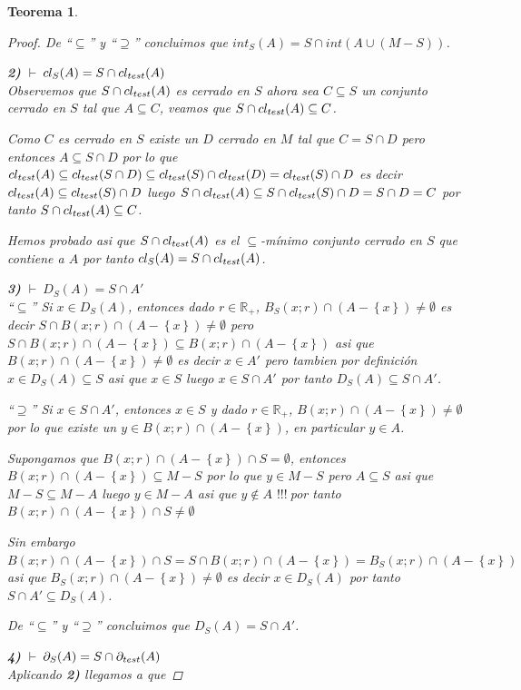\documentclass[oneside]{book} %
\theoremstyle{Teorema}
\newtheorem{Teorema}[Definicion]{Teorema}
\theoremstyle{Ejemplos}
\theoremstyle{[Obs]}
\def \test {test}
\newcommand{\cerradura}[2][\test]{\ifx \test #1 {\overline{#2}} \else {cl_{#1}(#2)} \fi} %
\newcommand{\frontera}[2][\test]{\ifx \test #1 {\partial(#2)} \else {\partial_{#1}(#2)} \fi} %
\renewcommand{\{}{\left\lbrace} %
\renewcommand{\}}{\right\rbrace} %
\renewcommand{\u}{\cup} %
\newcommand{\n}{\cap} %
\renewcommand{\sc}{\subseteq} %
\newcommand{\Sc}{\supseteq} %
\newcommand{\R}{\mathbb{R}} %
\newcommand{\pd}{$\vdash\ $} %
\renewcommand{\c}{$!!!\ $} %
\begin{document}
\begin{Teorema}
\begin{proof}
					De ``$\sc$'' y ``$\Sc$'' concluimos que $int_{S}(A) = S \n int(A \u (M - S))$.

					\textbf{2)} \pd $\cerradura[S]{A} = S \n \cerradura{A}$ \\ 
					Observemos que $S \n \cerradura{A}$ es cerrado en $S$ ahora sea $C \sc S$ un conjunto cerrado en $S$ tal que $A \sc C$, veamos que $S \n \cerradura{A} \sc C$.

					Como $C$ es cerrado en $S$ existe un $D$ cerrado en $M$ tal que $C = S \n D$ pero entonces $A \sc S \n D$ por lo que $\cerradura{A} \sc \cerradura{S \n D} \sc \cerradura{S} \n \cerradura{D} = \cerradura{S} \n D$ es decir $\cerradura{A} \sc \cerradura{S} \n D$ luego $S \n \cerradura{A} \sc S \n \cerradura{S} \n D = S \n D = C$ por tanto $S \n \cerradura{A} \sc C$.

					Hemos probado asi que $S \n \cerradura{A}$ es el $\sc$-mínimo conjunto cerrado en $S$ que contiene a $A$ por tanto $\cerradura[S]{A} = S \n \cerradura{A}$.

					\textbf{3)} \pd $D_{S}(A) = S \n A'$ \\ 
					``$\sc$'' Si $x \in D_{S}(A)$, entonces dado $r \in \R_{+}$, $B_{S}(x;r) \n (A - \{ x \}) \neq \emptyset$ es decir $S \n B(x;r) \n (A - \{ x \}) \neq \emptyset$ pero $S \n B(x;r) \n (A - \{ x \}) \sc B(x;r) \n (A - \{ x \})$ asi que $B(x;r) \n (A - \{ x \}) \neq \emptyset$ es decir $x \in A'$ pero tambien por definición $x \in D_{S}(A) \sc S$ asi que $x \in S$ luego $x \in S \n A'$ por tanto $D_{S}(A) \sc S \n A'$.

					``$\Sc$'' Si $x \in S \n A'$, entonces $x \in S$ y dado $r \in \R_{+}$, $B(x;r) \n (A - \{ x \}) \neq \emptyset$ por lo que existe un $y \in B(x;r) \n (A - \{ x \})$, en particular $y \in A$. 
					
					Supongamos que $B(x;r) \n (A - \{ x \}) \n S = \emptyset$, entonces $B(x;r) \n (A - \{ x \}) \sc M - S$ por lo que $y \in M - S$ pero $A \sc S$ asi que $M - S \sc M - A$ luego $y \in M - A$ asi que $y \notin A$ \c por tanto $B(x;r) \n (A - \{ x \}) \n S \neq \emptyset$ 
					
					Sin embargo $B(x;r) \n (A - \{ x \}) \n S = S \n B(x;r) \n (A - \{ x \}) = B_{S}(x;r) \n (A - \{ x \})$ asi que $B_{S}(x;r) \n (A - \{ x \}) \neq \emptyset$ es decir $x \in D_{S}(A)$ por tanto $S \n A' \sc D_{S}(A)$.
 
					De ``$\sc$'' y ``$\Sc$'' concluimos que $D_{S}(A) = S \n A'$.

					\textbf{4)} \pd $\frontera[S]{A} = S \n \frontera{A}$ \\ 
					Aplicando \textbf{2)} llegamos a que 


\end{proof}
\end{Teorema}
\end{document}
